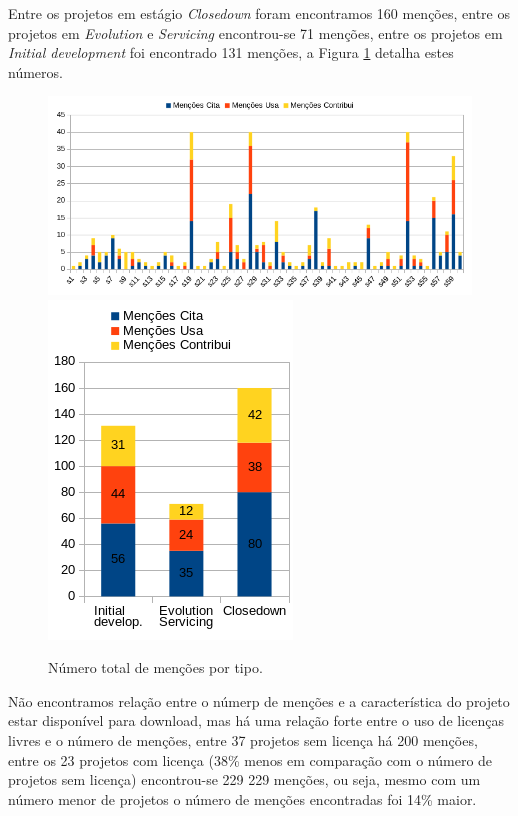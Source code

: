 Entre os projetos em estágio {\it Closedown} foram encontramos 160 menções,
entre os projetos em {\it Evolution} e {\it Servicing} encontrou-se 71 menções,
entre os projetos em {\it Initial development} foi encontrado 131 menções,
a Figura \ref{mentions-stages-total} detalha estes números.

\begin{figure}[h]
  \center
  \includegraphics[scale=0.6]{imagens/mentions-by-type.png}
  \includegraphics[scale=0.6]{imagens/mentions-stages-total.png}
  \caption{Número total de menções por tipo.}
  \label{mentions-stages-total}
\end{figure}

Não encontramos relação entre o númerp de menções e a característica do projeto
estar disponível para download, mas há uma relação forte entre o uso de
licenças livres e o número de menções, entre 37 projetos sem licença há 200
menções, entre os 23 projetos com licença (38\% menos em comparação com o
número de projetos sem licença) encontrou-se 229 229 menções, ou seja, mesmo
com um número menor de projetos o número de menções encontradas foi 14\% maior.

